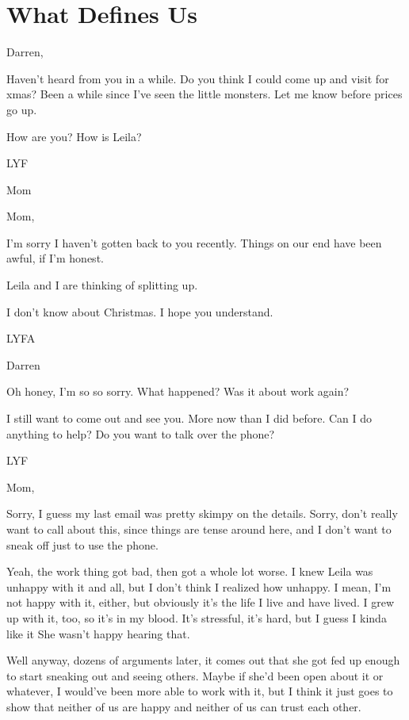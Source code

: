 \hypertarget{what-defines-us}{%
\chapter{What Defines Us}\label{what-defines-us}}

Darren,

Haven't heard from you in a while. Do you think I could come up and visit for xmas? Been a while since I've seen the little monsters. Let me know before prices go up.

How are you? How is Leila?

LYF

Mom

\secdiv{}

Mom,

I'm sorry I haven't gotten back to you recently. Things on our end have been awful, if I'm honest.

Leila and I are thinking of splitting up.

I don't know about Christmas. I hope you understand.

LYFA

Darren

\secdiv{}\newpage

Oh honey, I'm so so sorry. What happened? Was it about work again?

I still want to come out and see you. More now than I did before. Can I do anything to help? Do you want to talk over the phone?

LYF

\secdiv{}

Mom,

Sorry, I guess my last email was pretty skimpy on the details. Sorry, don't really want to call about this, since things are tense around here, and I don't want to sneak off just to use the phone.

Yeah, the work thing got bad, then got a whole lot worse. I knew Leila was unhappy with it and all, but I don't think I realized how unhappy. I mean, I'm not happy with it, either, but obviously it's the life I live and have lived. I grew up with it, too, so it's in my blood. It's stressful, it's hard, but I guess I kinda like it She wasn't happy hearing that.

Well anyway, dozens of arguments later, it comes out that she got fed up enough to start sneaking out and seeing others. Maybe if she'd been open about it or whatever, I would've been more able to work with it, but I think it just goes to show that neither of us are happy and neither of us can trust each other.

